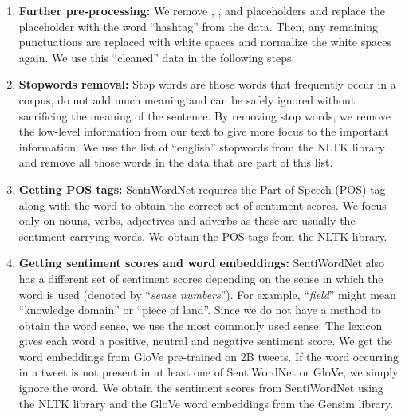 \begin{enumerate}
    \item \textbf{Further pre-processing:} We remove \maskRt{}, \maskEmoji{}, \maskUrl{} and \maskUser placeholders and replace the \maskHashtag placeholder with the word ``hashtag'' from the data. Then, any remaining punctuations are replaced with white spaces and normalize the white spaces again. We use this ``cleaned'' data in the following steps.
    
    \item \label{enum:models:our-model:method:stopwords} \textbf{Stopwords removal:} Stop words are those words that frequently occur in a corpus, do not add much meaning and can be safely ignored without sacrificing the meaning of the sentence. By removing stop words, we remove the low-level information from our text to give more focus to the important information. We use the list of ``english'' stopwords from the NLTK library and remove all those words in the data that are part of this list. %
    
    \item \textbf{Getting POS tags:} SentiWordNet requires the Part of Speech (POS) tag along with the word to obtain the correct set of sentiment scores. We focus only on nouns, verbs, adjectives and adverbs as these are usually the sentiment carrying words. We obtain the POS tags from the NLTK library. 
    
    \item \label{enum:models:our-model:method:swn-embd} \textbf{Getting sentiment scores and word embeddings:} SentiWordNet also has a different set of sentiment scores depending on the sense in which the word is used (denoted by ``\textit{sense numbers}''). For example, ``\textit{field}'' might mean ``knowledge domain'' or ``piece of land''. Since we do not have a method to obtain the word sense, we use the most commonly used sense. The lexicon gives each word a positive, neutral and negative sentiment score. We get the word embeddings from \ac{GloVe} pre-trained on 2B tweets. If the word occurring in a tweet is not present in at least one of SentiWordNet or \ac{GloVe}, we simply ignore the word. We obtain the sentiment scores from SentiWordNet using the NLTK library and the \ac{GloVe} word embeddings from the Gensim library.
    

\end{enumerate}
